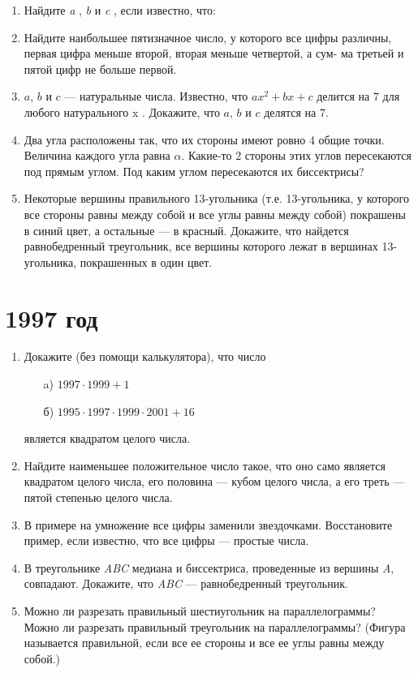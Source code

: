 \documentclass[12pt]{article}
\begin{document}
\begin{enumerate}
    \item Найдите \textit{a} , \textit{b} и \textit{c} , если известно, что:
    
    
    \item Найдите наибольшее пятизначное число, у которого все цифры различны, первая цифра меньше второй, вторая меньше четвертой, а сум-
ма третьей и пятой цифр не больше первой. 

    \item $a$, $b$ и $c$ --- натуральные числа. Известно, что $ax^2+bx+c$  делится на 7 для любого натурального x . Докажите, что $a$, $b$ и $c$ делятся на 7. 
    \item Два угла расположены так, что их стороны имеют ровно 4 общие точки. Величина каждого угла равна $\alpha$. Какие-то 2 стороны этих углов
пересекаются под прямым углом. Под каким углом пересекаются их
биссектрисы? 
    \item Некоторые вершины правильного 13-угольника (т.е. 13-угольника, у
которого все стороны равны между собой и все углы равны между собой) покрашены в синий цвет, а остальные --– в красный. Докажите, что
найдется равнобедренный треугольник, все вершины которого лежат в
вершинах 13-угольника, покрашенных в один цвет. 
\end{enumerate}

\section*{1997 год}
\begin{enumerate}
\item  Докажите (без помощи калькулятора), что число
\begin{enumerate}
\item[a)] $1997\cdot1999 + 1$
\item[б)] $1995\cdot1997\cdot1999\cdot2001 + 16$
\end{enumerate}
является квадратом целого числа. 
\item Найдите наименьшее положительное число такое, что оно само является квадратом целого числа, его половина --- кубом целого числа, а его
треть --- пятой степенью целого числа. 
\item В примере на умножение все цифры заменили звездочками.
Восстановите пример, если известно, что все цифры –-- простые числа.  %
\item В треугольнике \textit{ABC} медиана и биссектриса, проведенные
из вершины \textit{A}, совпадают. Докажите, что \textit{ABC} –-- равнобедренный треугольник. 
\item Можно ли разрезать правильный шестиугольник на параллелограммы?
Можно ли разрезать правильный треугольник на параллелограммы?
(Фигура называется правильной, если все ее стороны и все ее углы
равны между собой.) 
\end{enumerate}
\end{document}
